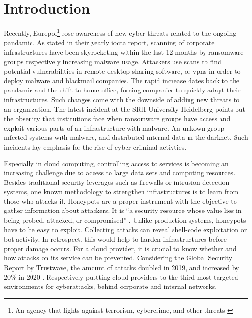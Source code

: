 \chapter{Introduction}

Recently, Europol\footnote{An agency that fights against terrorism, cybercrime, and other threats \cite{europol2021}} rose awareness of new cyber threats related to the ongoing pandamic.
As stated in their yearly \ac{iocta} report, scanning of corporate infrastructures have been skyrocketing within the last 12 months by ransomware groups respectively increasing malware usage.
Attackers use scans to find potential vulnerabilities in remote desktop sharing software, or \acp{vpn} in order to deploy malware and blackmail companies. \cite{iocta2020}
The rapid increase dates back to the pandamic and the shift to home office, forcing companies to quickly adapt their infrastructures.
Such changes come with the downside of adding new threats to an organization.
The latest incident at the SRH University Heidelberg points out the obsenity that institutions face when ransomware groups have access and exploit various parts of an infrastructure with malware.
An unkown group infected systems with malware, and distributed internal data in the darknet.
Such incidents lay emphasis for the rise of cyber criminal activties.

Especially in cloud computing, controlling access to services is becoming an increasing challenge due to access to large data sets and computing resources.
Besides traditional security leverages such as firewalls or intrusion detection systems, one known methodology to strengthen infrastructures is to learn from those who attacks it.
Honeypots are a proper instrument with the objective to gather information about attackers.
It is \enquote{a security resource whose value lies in being probed, attacked, or compromised} \cite{Spitzner2003}.
Unlike production systems, honeypots have to be easy to exploit. 
Collecting attacks can reveal shell-code exploitation or bot activity.
In retrospect, this would help to harden infrastructures before proper damage occurs.
For a cloud provider, it is crucial to know whether and how attacks on its service can be prevented.
Considering the Global Security Report by Trustwave, the amount of attacks doubled in 2019, and increased by $20\%$ in 2020 \cite{fahim2020}.
Respectively puttting cloud providers to the third most targeted environments for cyberattacks, behind corporate and internal networks.

